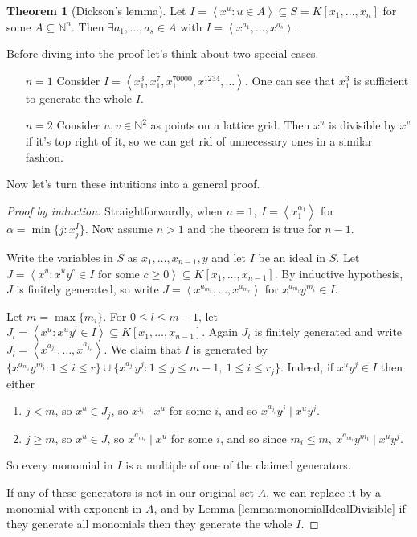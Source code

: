 \documentclass[a4paper]{article}
\newcommand{\la}{\left\langle}
\newcommand{\ra}{\right\rangle}
\theoremstyle{definition}
\newtheorem{thm}[defn]{Theorem}
\begin{document}
\begin{thm}[Dickson's lemma]
Let $I=\la x^u:u\in A\ra \subseteq S=K[x_1,\ldots,x_n]$ for some $A\subseteq \mathbb N^n$. Then $\exists a_1,\ldots,a_s\in A$ with $I=\la x^{a_1},\ldots,x^{a_s} \ra$.
\end{thm}
Before diving into the proof let's think about two special cases.
\begin{itemize}
\item[$n=1$] Consider $I=\la x_1^3,x_1^7,x_1^{70000},x_1^{1234},\ldots\ra$. One can see that $x_1^3$ is sufficient to generate the whole $I$.
\item[$n=2$] Consider $u,v\in\mathbb N^2$ as points on a lattice grid. Then $x^u$ is divisible by $x^v$ if it's top right of it, so we can get rid of unnecessary ones in a similar fashion.
\end{itemize}
Now let's turn these intuitions into a general proof.
\begin{proof}[Proof by induction]
Straightforwardly, when $n=1,\ I=\la x_1^{\alpha_1}\ra$ for $\alpha=\min \{j:x_j^I \}$. Now assume $n>1$ and the theorem is true for $n-1$.

Write the variables in $S$ as $x_1,\ldots,x_{n-1},y$ and let $I$ be an ideal in $S$. Let $J=\la x^u:x^uy^c\in I\text{ for some }c\geq 0\ra\subseteq K[x_1,\ldots,x_{n-1}]$. By inductive hypothesis, $J$ is finitely generated, so write $J=\la x^{a_{m_1}}, \ldots, x^{a_{m_r}}\ra $ for $x^{a_{m_i}}y^{m_i}\in I$.

Let $m=\max \{m_i\}$. For $0\leq l\leq m-1$, let $J_l=\la x^u:x^u y^l\in I\ra\subseteq K[x_1,\ldots,x_{n-1}]$. Again $J_l$ is finitely generated and write $J_l=\la x^{a_{j_1}},\ldots,x^{a_{j_{r_l}}}\ra$. We claim that $I$ is generated by $\{x^{a_{m_i}} y^{m_i}:1\leq i\leq r\} \cup \{x^{a_{j_i}}y^{j} : 1\leq j\leq m-1,\ 1\leq i\leq r_j\}$. Indeed, if $x^u y^j\in I$ then either
\begin{enumerate}
\item $j<m$, so $x^u\in J_j$, so  $x^{j_i} \mid x^u$ for some $i$, and so $x^{a_{j_i}} y^j\mid x^u y^j$.
\item $j\geq m$, so $x^u\in J$, so $x^{a_{m_i}} \mid x^u$ for some $i$, and so since $m_i\leq m,\ x^{a_{m_i}} y^{m_i}\mid x^u y^j$.
\end{enumerate}
So every monomial in $I$ is a multiple of one of the claimed generators.

If any of these generators is not in our original set $A$, we can replace it by a monomial with exponent in $A$, and by Lemma \ref{lemma:monomialIdealDivisible} if they generate all monomials then they generate the whole $I$.
\end{proof}
\end{document}
